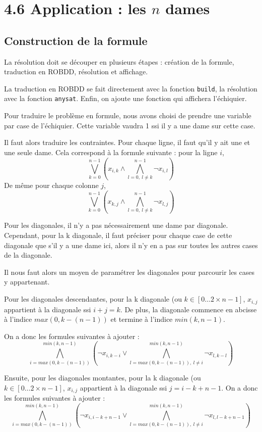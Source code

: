 \documentclass[12pt]{article}
\def\code#1{\texttt{#1}}
\begin{document}
\section*{4.6 Application : les $n$ dames}

\subsection*{Construction de la formule}
La résolution doit se découper en plusieurs étapes : création de la formule, traduction en ROBDD, résolution et affichage.

La traduction en ROBDD se fait directement avec la fonction \code {build}, la résolution avec la fonction \code{anysat}. Enfin, on ajoute une fonction qui affichera l'échiquier.

Pour traduire le problème en formule, nous avons choisi de prendre une variable par case de l'échiquier. Cette variable vaudra 1 ssi il y a une dame sur cette case.

Il faut alors traduire les contraintes. Pour chaque ligne, il faut qu'il y ait une et une seule dame. Cela correspond à la formule suivante : 
pour la ligne $i$, 
$$\bigvee_{k=0}^{n-1} \left( x_{i,k}\wedge\bigwedge_{l=0,\ l\neq k}^{n-1} \neg x_{i,l}\right)$$
De même pour chaque colonne $j$, 
$$\bigvee_{k=0}^{n-1} \left( x_{k,j}\wedge\bigwedge_{l=0,\ l\neq k}^{n-1} \neg x_{l,j}\right)$$

Pour les diagonales, il n'y a pas nécessairement une dame par diagonale. Cependant, pour la k diagonale, il faut préciser pour chaque case de cette diagonale que s'il y a une dame ici, alors il n'y en a pas sur toutes les autres cases de la diagonale.

Il nous faut alors un moyen de paramétrer les diagonales pour parcourir les cases y appartenant.

Pour les diagonales descendantes, pour la k diagonale (ou $k\in[0\dots 2\times n-1]$, $x_{i,j}$ appartient à la diagonale ssi $i+j=k$. De plus, la diagonale commence en abcisse à l'indice $max(0,k-(n-1))$ et termine à l'indice $min(k,n-1)$. %

On a donc les formules suivantes à ajouter :
$$\bigwedge_{i=max(0,k-(n-1))}^{min(k,n-1)} \left( \neg x_{i, k-i} \vee\bigwedge_{l=max(0,k-(n-1)),\ l\neq i}^{min(k,n-1)} \neg x_{l, k-l}\right)$$


Ensuite, pour les diagonales montantes, pour la k diagonale (ou $k\in[0\dots 2\times n-1]$, $x_{i,j}$ appartient à la diagonale ssi $j=i-k+n-1$. 
On a donc les formules suivantes à ajouter :
$$\bigwedge_{i=max(0,k-(n-1))}^{min(k,n-1)} \left( \neg x_{i, i-k+n-1} \vee\bigwedge_{l=max(0,k-(n-1)),\ l\neq i}^{min(k,n-1)} \neg x_{l, l-k+n-1}\right)$$
\end{document}
